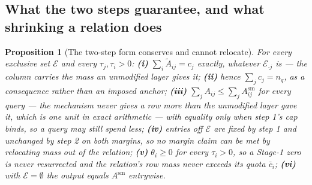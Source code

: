 \documentclass{article}
\newtheorem{proposition}{Proposition}
\begin{document}
\subsection{What the two steps guarantee, and what shrinking a relation does}

\begin{proposition}[The two-step form conserves and cannot relocate]
\label{prop:twostep}
For every exclusive set $\mathcal{E}$ and every $\tau_j,\tau_i>0$:
\textbf{(i)} $\sum_i \tilde A_{ij} = c_j$ exactly, whatever $\mathcal{E}_{\cdot j}$ is --- the
column carries the mass an unmodified layer gives it;
\textbf{(ii)} hence $\sum_j c_j = n_q$, as a consequence rather than an imposed anchor;
\textbf{(iii)} $\sum_j A_{ij}\le \sum_j A^{\mathrm{sm}}_{ij}$ for every query --- the mechanism
never gives a row more than the unmodified layer gave it, which is one unit in exact arithmetic
--- with equality only when step 1's cap binds, so a query may still spend less;
\textbf{(iv)} entries off $\mathcal{E}$ are fixed by step 1 and unchanged by step 2 on both
margins, so no margin claim can be met by relocating mass out of the relation;
\textbf{(v)} $\theta_i\ge0$ for every $\tau_i>0$, so a Stage-1 zero is never resurrected and
the relation's row mass never exceeds its quota $\bar c_i$;
\textbf{(vi)} with $\mathcal{E}=\emptyset$ the output equals $A^{\mathrm{sm}}$ entrywise.
\end{proposition}
\end{document}
